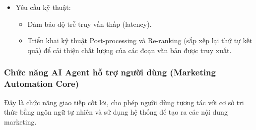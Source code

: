 \begin{itemize}
\item
  Yêu cầu kỹ thuật:

  \begin{itemize}
  \item
    Đảm bảo độ trễ truy vấn thấp (latency).
  \item
    Triển khai kỹ thuật Post-processing và Re-ranking (sắp xếp lại thứ
    tự kết quả) để cải thiện chất lượng của các đoạn văn bản được truy
    xuất.
  \end{itemize}
\end{itemize}

\subsubsection{Chức năng AI Agent hỗ trợ người dùng (Marketing Automation
Core)}\label{chux1ee9c-nux103ng-ai-agent-hux1ed7-trux1ee3-ngux1b0ux1eddi-duxf9ng-marketing-automation-core}

Đây là chức năng giao tiếp cốt lõi, cho phép người dùng tương tác với cơ
sở tri thức bằng ngôn ngữ tự nhiên và sử dụng hệ thống để tạo ra các nội
dung marketing.

